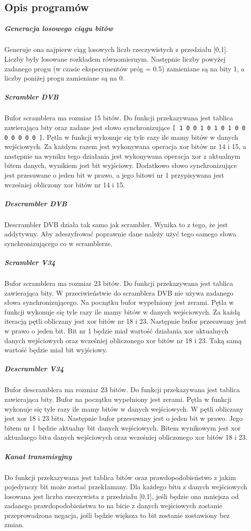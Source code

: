 \documentclass[polish, 11pt]{article}
\begin{document}
    \subsection{Opis programów}
    	\subparagraph{Generacja losowego ciągu bitów \\}
    	 Generuje ona najpierw ciąg losowych liczb rzeczywistych z przedziału [0,1]. Liczby były losowane rozkładem równomiernym.
        Następnie liczby powyżej zadanego progu (w czasie eksperymentów próg = 0.5) zamieniane są na bity 1,
        a liczby poniżej progu zamieniane są na 0.
    	\subparagraph{Scrambler DVB\\}
    	Bufor scramblera ma rozmiar 15 bitów. Do funkcji przekazywana jest tablica zawierająca bity  oraz zadane jest słowo synchronizujące \texttt{[ 1 0 0 1 0 1 0 1 0 0 0 0 0 0 0 ]}. Pętla w funkcji wykonuje się tyle razy ile mamy bitów w danych wejściowych. Za każdym razem jest wykonywana operacja xor bitów nr 14 i 15, a następnie na wyniku tego działania jest wykonywana operacja xor z aktualnym bitem danych, wynikiem jest bit wyjściowy. Dodatkowo słowo synchronizujące jest przesuwane o jeden bit w prawo, a jego  bitowi nr 1 przypisywana jest wcześniej obliczony xor bitów nr 14 i 15.
    	\subparagraph{Descrambler DVB\\}
    	Descrambler DVB działa tak samo jak scrambler. Wynika to z tego, że jest addytywny. Aby zdeszyfrować poprawnie dane należy użyć tego samego słowa synchronizującego co w scramblerze.  
    	\subparagraph{Scrambler V34\\}
    
    	Bufor scramblera ma rozmiar 23 bitów. Do funkcji przekazywana jest tablica zawierająca bity. W przeciwieństwie do scramblera DVB nie używa zadanego słowa synchronizującego. Na początku bufor wypełniony jest zerami. Pętla w funkcji wykonuje się tyle razy ile mamy bitów w danych wejściowych.  Za każdą iteracją pętli obliczany jest xor bitów nr 18 i 23. Następnie bufor przesuwany jest w prawo o jeden bit. Bit nr 1 będzie miał wartość działania xor aktualnych danych wejściowych oraz wcześniej obliczonego xor bitów nr 18 i 23. Taką samą wartość będzie miał bit wyjściowy.
    	\subparagraph{Descrambler V34\\}
    	Bufor descramblera ma rozmiar 23 bitów. Do funkcji przekazywana jest tablica zawierająca bity. Bufor na początku wypełniony jest zerami. Pętla w funkcji wykonuje się tyle razy ile mamy bitów w danych wejściowych. W pętli obliczany jest xor 18 i 23 bitu. Następnie bufor przesuwany jest o jeden bit w prawo. Jego bitem nr 1 będzie aktualny bit danych wejściowych. Bitem wynikowym jest xor aktualnego bitu danych wejściowych oraz wcześniej obliczonego xor bitów 18 i 23.
    	\subparagraph{Kanał transmisyjny\\}
    	Do funkcji przekazywana jest tablica bitów oraz prawdopodobieństwo z jakim pojedynczy bit może zostać przekłamany. Dla każdego bitu z danych wejściowych losowana jest liczba rzeczywista z przedziału [0,1], jeśli będzie ona mniejsza od zadanego prawdopodobieństwa to na bicie z danych wejściowych zostanie przeprowadzona negacja, jeśli będzie większa to bit zostanie zostawiony bez zmian.
\end{document}
